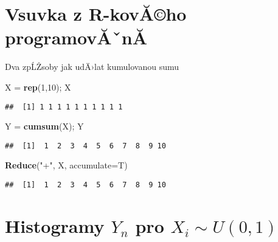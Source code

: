\documentclass[
]{article}
\newenvironment{Shaded}{\begin{snugshade}}{\end{snugshade}}
\newcommand{\AttributeTok}[1]{\textcolor[rgb]{0.13,0.29,0.53}{#1}}
\newcommand{\DecValTok}[1]{\textcolor[rgb]{0.00,0.00,0.81}{#1}}
\newcommand{\FunctionTok}[1]{\textcolor[rgb]{0.13,0.29,0.53}{\textbf{#1}}}
\newcommand{\NormalTok}[1]{#1}
\newcommand{\OtherTok}[1]{\textcolor[rgb]{0.56,0.35,0.01}{#1}}
\newcommand{\StringTok}[1]{\textcolor[rgb]{0.31,0.60,0.02}{#1}}
\begin{document}
\hypertarget{vsuvka-z-r-kovux103ho-programovux103ux2c7nux103}{%
\section{Vsuvka z R-kovĂ©ho
programovĂˇnĂ­}\label{vsuvka-z-r-kovux103ho-programovux103ux2c7nux103}}

Dva zpĹŻsoby jak udÄ›lat kumulovanou sumu

\begin{Shaded}
\begin{Highlighting}[]
\NormalTok{X }\OtherTok{=} \FunctionTok{rep}\NormalTok{(}\DecValTok{1}\NormalTok{,}\DecValTok{10}\NormalTok{); X}
\end{Highlighting}
\end{Shaded}

\begin{verbatim}
##  [1] 1 1 1 1 1 1 1 1 1 1
\end{verbatim}

\begin{Shaded}
\begin{Highlighting}[]
\NormalTok{Y }\OtherTok{=} \FunctionTok{cumsum}\NormalTok{(X); Y}
\end{Highlighting}
\end{Shaded}

\begin{verbatim}
##  [1]  1  2  3  4  5  6  7  8  9 10
\end{verbatim}

\begin{Shaded}
\begin{Highlighting}[]
\FunctionTok{Reduce}\NormalTok{(}\StringTok{"+"}\NormalTok{, X, }\AttributeTok{accumulate=}\NormalTok{T)}
\end{Highlighting}
\end{Shaded}

\begin{verbatim}
##  [1]  1  2  3  4  5  6  7  8  9 10
\end{verbatim}

\hypertarget{histogramy-y_n-pro-x_i-sim-u01}{%
\section{\texorpdfstring{Histogramy \(Y_n\) pro
\(X_i \sim U(0,1)\)}{Histogramy Y\_n pro X\_i \textbackslash sim U(0,1)}}\label{histogramy-y_n-pro-x_i-sim-u01}}
\end{document}
